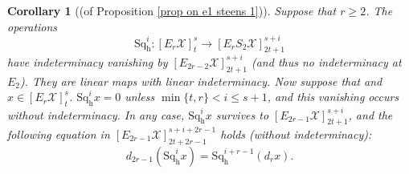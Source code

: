 \documentclass[11pt]{amsart} \renewcommand{\baselinestretch}{1.2}
\theoremstyle{plain}
\newtheorem{cor}[thm]{Corollary}
\numberwithin{equation}{section} %
\theoremstyle{plain}
\newtheorem{cor}[thm]{Corollary}
\numberwithin{equation}{chapter} %
\renewcommand{\to}{\longrightarrow}
\newcommand{\calX}{\mathcal{X}}
\newcommand{\calx}{\mathcal{X}}
\newcommand{\Edownup}[5]{[E_{#1}^{#2}#3]^{#4}_{#5}}
\newcommand{\dhor}{_\mathrm{h}}
\newcommand{\Sqh}{\mathrm{Sq}\dhor}
\begin{document}
\begin{Operations on the Bousfield-Kan spectral sequence}
%
%


\begin{cor}[(of Proposition \ref{prop on e1 steens 1})]
\label{prop on e1 steens 1 composed with lift}
Suppose that $r\geq 2$. The operations \[\Sqh^i:\Edownup{r}{}{\calx}{s}{t}\to \Edownup{r}{}{S_2\calx}{s+i}{2t+1}\] have indeterminacy vanishing by $\Edownup{2r-2}{}{\calx}{s+i}{2t+1}$ (and thus no indeterminacy at $E_2$). They are linear maps with linear indeterminacy.
Now suppose that and $x\in\Edownup{r}{}{\calX}{s}{t}$. %
$\Sqh^ix=0$ unless $\min\{t,r\}< i\leq s+1$,  and this vanishing occurs without indeterminacy.
In any case, $\Sqh^ix$ survives to $\Edownup{2r-1}{}{\calX}{s+i}{2t+1}$, and the following equation in $\Edownup{2r-1}{}{\calX}{s+i+2r-1}{2t+2r-1}$ holds (without indeterminacy): \[d_{2r-1}(\Sqh^ix)=\Sqh^{i+r-1}(d_rx).\]


\end{cor}
\end{Operations on the Bousfield-Kan spectral sequence}
\end{document}
